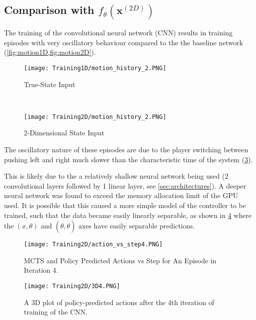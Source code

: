 \documentclass[../main.tex]{subfiles}
\begin{document}
\subsection{Comparison with $f_{\theta}(\boldsymbol{x}^{(2D)})$}

The training of the convolutional neural network (CNN) results in training episodes with very oscillatory behaviour compared to the the baseline network (\cref{fig:motion1D,fig:motion2D}).

\begin{figure*}[h]
    \centering
    \begin{subfigure}[t]{0.49\textwidth}
        \centering
        \texttt{[image: Training1D/motion\_history\_2.PNG]}
        \caption{True-State Input}
        \label{fig:motion1D}
    \end{subfigure}%
    ~ 
    \begin{subfigure}[t]{0.49\textwidth}
        \centering
        \texttt{[image: Training2D/motion\_history\_2.PNG]}
        \caption{2-Dimensional State Input}
        \label{fig:motion2D}
    \end{subfigure}
    \caption{Motion history images showing the trajectories of 5 episodes for both neural networks. Higher valued colours represent more recent positions (or positions with multiple visits as the images are computed as a sum of discounted states).}
\end{figure*}

The oscillatory nature of these episodes are due to the player switching between pushing left and right much slower than the characteristic time of the system (\cref{fig:2Daction4}).

This is likely due to the a relatively shallow neural network being used (2 convolutional layers followed by 1 linear layer, see \cref{sec:architectures}). A deeper neural network was found to exceed the memory allocation limit of the GPU used. It is possible that this caused a more simple model of the controller to be trained, such that the data became easily linearly separable, as shown in \cref{fig:2D3D4} where the $(x, \theta)$ and $(\theta, \dot{\theta})$ axes have easily separable predictions. 

\begin{figure}[H]
    \centering
    \texttt{[image: Training2D/action\_vs\_step4.PNG]}
    \caption{MCTS and Policy Predicted Actions vs Step for An Episode in Iteration 4.}
    \label{fig:2Daction4}
\end{figure}
\begin{figure}[H]
    \centering
    \texttt{[image: Training2D/3D4.PNG]}
    \caption{A 3D plot of policy-predicted actions after the 4th iteration of training of the CNN.}
    \label{fig:2D3D4}
\end{figure}
\end{document}
